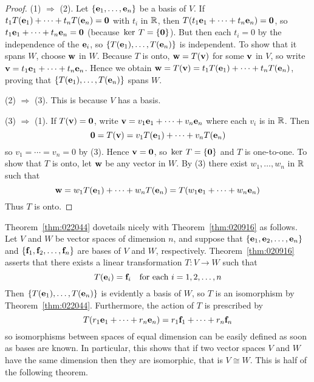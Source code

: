 \begin{proof}
(1) $\Rightarrow$ (2). Let $\{\textbf{e}_{1}, \dots, \textbf{e}_{n}\}$ be a basis of $V$. If $t_{1}T(\textbf{e}_{1}) + \cdots + t_{n}T(\textbf{e}_{n}) = \textbf{0}$ with $t_{i}$ in $\mathbb{R}$, then $T(t_{1}\textbf{e}_{1} + \cdots + t_{n}\textbf{e}_{n}) = \textbf{0}$, so $t_{1}\textbf{e}_{1} + \cdots + t_{n}\textbf{e}_{n} = \textbf{0}$ (because $\thinspace\operatorname{ker \medspace}T = \{\textbf{0}\}$). But then each $t_{i} = 0$ by the independence of the $\textbf{e}_{i}$, so $\{T(\textbf{e}_{1}), \dots, T(\textbf{e}_{n})\}$ is independent. To show that it spans $W$, choose $\textbf{w}$ in $W$. Because $T$ is onto, $\textbf{w} = T(\textbf{v})$ for some $\textbf{v}$ in $V$, so write $\textbf{v} = t_{1}\textbf{e}_{1} + \cdots + t_{n}\textbf{e}_{n}$. Hence we obtain $\textbf{w} = T(\textbf{v}) = t_{1}T(\textbf{e}_{1}) + \cdots + t_{n}T(\textbf{e}_{n})$, proving that $\{T(\textbf{e}_{1}), \dots, T(\textbf{e}_{n})\}$ spans $W$.


(2) $\Rightarrow$ (3). This is because $V$ has a basis.


(3) $\Rightarrow$ (1). If $T(\textbf{v}) = \textbf{0}$, write $\textbf{v} = v_{1}\textbf{e}_{1} + \cdots + v_{n}\textbf{e}_{n}$ where each $v_{i}$ is in $\mathbb{R}$. Then 
\begin{equation*}
\textbf{0} = T(\textbf{v}) = v_{1}T(\textbf{e}_{1}) + \cdots + v_{n}T(\textbf{e}_{n})
\end{equation*}
so $v_{1} = \cdots = v_{n} = 0$ by (3). Hence $\textbf{v} = \textbf{0}$, so $\thinspace\operatorname{ker \medspace}T = \{\textbf{0}\}$ and $T$ is one-to-one. To show that $T$ is onto, let $\textbf{w}$ be any vector in $W$. By (3) there exist $w_{1}, \dots, w_{n}$ in $\mathbb{R}$ such that
\begin{equation*}
\textbf{w} = w_{1}T(\textbf{e}_1) + \cdots + w_{n}T(\textbf{e}_n) = T(w_{1}\textbf{e}_1 + \cdots + w_n\textbf{e}_n)
\end{equation*}
Thus $T$ is onto.
\end{proof}

Theorem~\ref{thm:022044} dovetails nicely with Theorem~\ref{thm:020916} as follows. Let $V$ and $W$ be vector spaces of dimension $n$, and suppose that $\{\textbf{e}_{1}, \textbf{e}_{2}, \dots, \textbf{e}_{n}\}$ and $\{\textbf{f}_{1}, \textbf{f}_{2}, \dots, \textbf{f}_{n}\}$ are bases of $V$ and $W$, respectively. Theorem~\ref{thm:020916} asserts that there exists a linear transformation $T : V \to W$ such that
\begin{equation*}
T(\textbf{e}_i) = \textbf{f}_i \quad \mbox{for each } i = 1, 2, \dots, n
\end{equation*}
Then $\{T(\textbf{e}_{1}), \dots, T(\textbf{e}_{n})\}$ is evidently a basis of $W$, so $T$ is an isomorphism by Theorem~\ref{thm:022044}. Furthermore, the action of $T$ is prescribed by
\begin{equation*}
T(r_1\textbf{e}_1 + \cdots + r_n\textbf{e}_n) = r_1\textbf{f}_1 + \cdots + r_n\textbf{f}_n
\end{equation*}
so isomorphisms between spaces of equal dimension can be easily defined as soon as bases are known. In particular, this shows that if two vector spaces $V$ and $W$ have the same dimension then they are isomorphic, that is $V \cong W$. This is half of the following theorem.


